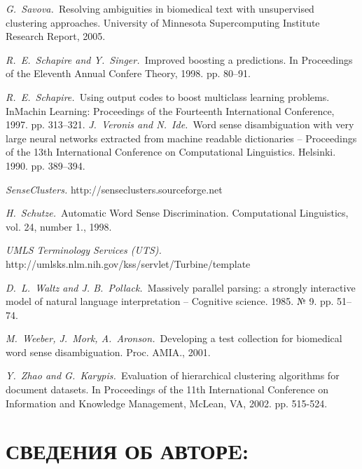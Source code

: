 \documentclass{article}
\begin{document}
\begin{articletext}
\begin{thebibliography}{9}
\textit{G.~Savova.~}Resolving ambiguities in biomedical text with unsupervised clustering approaches. University of Minnesota Supercomputing Institute Research Report, 2005.

\textit{R.~E.~Schapire and Y.~Singer.~}Improved boosting a predictions. In Proceedings of the Eleventh Annual Confere Theory, 1998. pp. 80–91. 

\textit{R.~E.~Schapire.~}Using output codes to boost multiclass learning problems. InMachin Learning: Proceedings of the Fourteenth International Conference, 1997. pp. 313–321. 
\textit{J.~Veronis and N.~Ide.~}Word  sense  disambiguation  with  very  large neural  networks  extracted  from machine readable dictionaries – Proceedings of the 13th International Conference on Computational Linguistics. Helsinki. 1990. pp. 389–394.

\textit{SenseClusters. } http://senseclusters.sourceforge.net

\textit{H.~Schutze.~}Automatic Word Sense Discrimination. Computational Linguistics, vol. 24, number 1., 1998.

\textit{UMLS Terminology Services (UTS).} http://umlsks.nlm.nih.gov/kss/servlet/Turbine/template

\textit{D.~L.~Waltz and J. B.~Pollack.~}Massively parallel parsing: a strongly interactive  model  of  natural  language interpretation – Cognitive science. 1985. № 9. pp. 51–74.

\textit{M.~Weeber, J.~Mork, A.~Aronson.~}Developing a test collection for biomedical word sense disambiguation. Proc. AMIA., 2001.

\textit{Y.~Zhao and G.~Karypis.~}Evaluation of hierarchical clustering algorithms for document datasets. In Proceedings of the 11th International Conference on Information and Knowledge Management, McLean, VA, 2002. pp. 515-524.



\end{thebibliography}
\end{articletext}


\section{СВЕДЕНИЯ ОБ АВТОРE:}
\end{document}
